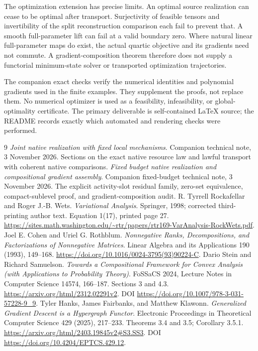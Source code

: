 \documentclass[11pt]{article}
\theoremstyle{remark}
\begin{document}
The optimization extension has precise limits. An optimal source realization can cease to be optimal after transport. Surjectivity of feasible tensors and invertibility of the split reconstruction comparison each fail to prevent that. A smooth full-parameter lift can fail at a valid boundary zero. Where natural linear full-parameter maps do exist, the actual quartic objective and its gradients need not commute. A gradient-composition theorem therefore does not supply a functorial minimum-state solver or transported optimization trajectories.

The companion exact checks verify the numerical identities and polynomial gradients used in the finite examples. They supplement the proofs, not replace them. No numerical optimizer is used as a feasibility, infeasibility, or global-optimality certificate. The primary deliverable is self-contained \LaTeX{} source; the README records exactly which automated and rendering checks were performed.

\begin{thebibliography}{9}
\emph{Joint native realization with fixed local mechanisms}.
Companion technical note, 3 November 2026. Sections on the exact native resource law and lawful transport with coherent native comparisons.
\emph{Fixed budget native realization and compositional gradient assembly}.
Companion fixed-budget technical note, 3 November 2026. The explicit activity-slot residual family, zero-set equivalence, compact-sublevel proof, and gradient-composition audit.
R. Tyrrell Rockafellar and Roger J.-B. Wets.
\emph{Variational Analysis}. Springer, 1998; corrected third-printing author text.
Equation 1(17), printed page 27.
\url{https://sites.math.washington.edu/~rtr/papers/rtr169-VarAnalysis-RockWets.pdf}.
Joel E. Cohen and Uriel G. Rothblum.
\emph{Nonnegative Ranks, Decompositions, and Factorizations of Nonnegative Matrices}.
Linear Algebra and its Applications 190 (1993), 149--168.
\url{https://doi.org/10.1016/0024-3795(93)90224-C}.
Dario Stein and Richard Samuelson.
\emph{Towards a Compositional Framework for Convex Analysis
(with Applications to Probability Theory)}.
FoSSaCS 2024, Lecture Notes in Computer Science 14574, 166--187.
Sections 3 and 4.3.
\url{https://arxiv.org/html/2312.02291v2}.
DOI \url{https://doi.org/10.1007/978-3-031-57228-9_9}.
Tyler Hanks, James Fairbanks, and Matthew Klawonn.
\emph{Generalized Gradient Descent is a Hypergraph Functor}.
Electronic Proceedings in Theoretical Computer Science 429 (2025), 217--233.
Theorems 3.4 and 3.5; Corollary 3.5.1.
\url{https://arxiv.org/html/2403.19845v2#S3.SS3}.
DOI \url{https://doi.org/10.4204/EPTCS.429.12}.
\end{thebibliography}
\end{document}

